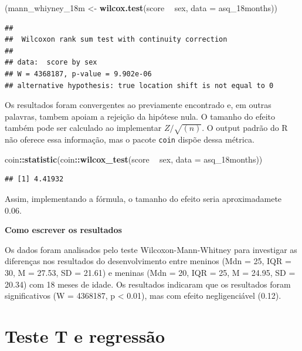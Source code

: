 \documentclass[
]{book}
\newenvironment{Shaded}{\begin{snugshade}}{\end{snugshade}}
\newcommand{\DataTypeTok}[1]{\textcolor[rgb]{0.13,0.29,0.53}{#1}}
\newcommand{\KeywordTok}[1]{\textcolor[rgb]{0.13,0.29,0.53}{\textbf{#1}}}
\newcommand{\NormalTok}[1]{#1}
\newcommand{\OperatorTok}[1]{\textcolor[rgb]{0.81,0.36,0.00}{\textbf{#1}}}
\newcommand{\StringTok}[1]{\textcolor[rgb]{0.31,0.60,0.02}{#1}}
\begin{document}
\begin{Shaded}
\begin{Highlighting}[]
\NormalTok{(mann_whiyney_18m <-}\StringTok{ }\KeywordTok{wilcox.test}\NormalTok{(score }\OperatorTok{~}\StringTok{ }\NormalTok{sex, }\DataTypeTok{data =}\NormalTok{ asq_18months))}
\end{Highlighting}
\end{Shaded}

\begin{verbatim}
## 
##  Wilcoxon rank sum test with continuity correction
## 
## data:  score by sex
## W = 4368187, p-value = 9.902e-06
## alternative hypothesis: true location shift is not equal to 0
\end{verbatim}

Os resultados foram convergentes ao previamente encontrado e, em outras palavras, tambem apoiam a rejeição da hipótese nula. O tamanho do efeito também pode ser calculado ao implementar \(Z/\sqrt{(n)}\). O output padrão do R não oferece essa informação, mas o pacote \texttt{coin} dispõe dessa métrica.

\begin{Shaded}
\begin{Highlighting}[]
\NormalTok{coin}\OperatorTok{::}\KeywordTok{statistic}\NormalTok{(coin}\OperatorTok{::}\KeywordTok{wilcox_test}\NormalTok{(score }\OperatorTok{~}\StringTok{ }\NormalTok{sex, }\DataTypeTok{data =}\NormalTok{ asq_18months))}
\end{Highlighting}
\end{Shaded}

\begin{verbatim}
## [1] 4.41932
\end{verbatim}

Assim, implementando a fórmula, o tamanho do efeito seria aproximadamete 0.06.

\begin{writing}
\textbf{Como escrever os resultados}

Os dados foram analisados pelo teste Wilcoxon-Mann-Whitney para
investigar as diferenças nos resultados do desenvolvimento entre meninos
(Mdn = 25, IQR = 30, M = 27.53, SD = 21.61) e meninas (Mdn = 20, IQR =
25, M = 24.95, SD = 20.34) com 18 meses de idade. Os resultados
indicaram que os resultados foram significativos (W = 4368187, p
\textless{} 0.01), mas com efeito negligenciável (0.12).
\end{writing}

\hypertarget{teste-t-e-regressuxe3o}{%
\section{Teste T e regressão}\label{teste-t-e-regressuxe3o}}
\end{document}
